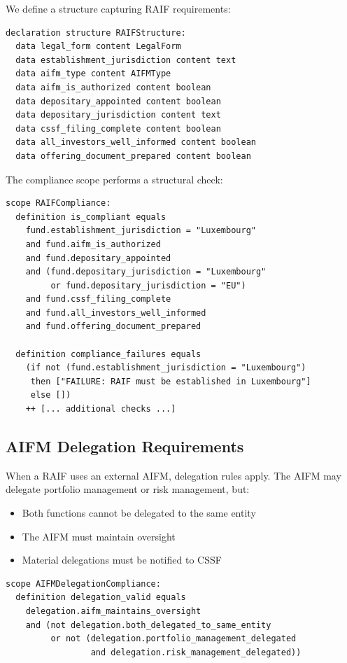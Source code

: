 We define a structure capturing RAIF requirements:

\begin{lstlisting}
declaration structure RAIFStructure:
  data legal_form content LegalForm
  data establishment_jurisdiction content text
  data aifm_type content AIFMType
  data aifm_is_authorized content boolean
  data depositary_appointed content boolean
  data depositary_jurisdiction content text
  data cssf_filing_complete content boolean
  data all_investors_well_informed content boolean
  data offering_document_prepared content boolean
\end{lstlisting}

The compliance scope performs a structural check:

\begin{lstlisting}
scope RAIFCompliance:
  definition is_compliant equals
    fund.establishment_jurisdiction = "Luxembourg"
    and fund.aifm_is_authorized
    and fund.depositary_appointed
    and (fund.depositary_jurisdiction = "Luxembourg" 
         or fund.depositary_jurisdiction = "EU")
    and fund.cssf_filing_complete
    and fund.all_investors_well_informed
    and fund.offering_document_prepared

  definition compliance_failures equals
    (if not (fund.establishment_jurisdiction = "Luxembourg")
     then ["FAILURE: RAIF must be established in Luxembourg"]
     else [])
    ++ [... additional checks ...]
\end{lstlisting}

\subsection{AIFM Delegation Requirements}
\label{sec:delegation}

When a RAIF uses an external AIFM, delegation rules apply. The AIFM may delegate portfolio management or risk management, but:

\begin{itemize}
  \item Both functions cannot be delegated to the same entity
  \item The AIFM must maintain oversight
  \item Material delegations must be notified to CSSF
\end{itemize}

\begin{lstlisting}
scope AIFMDelegationCompliance:
  definition delegation_valid equals
    delegation.aifm_maintains_oversight
    and (not delegation.both_delegated_to_same_entity 
         or not (delegation.portfolio_management_delegated 
                 and delegation.risk_management_delegated))
\end{lstlisting}

